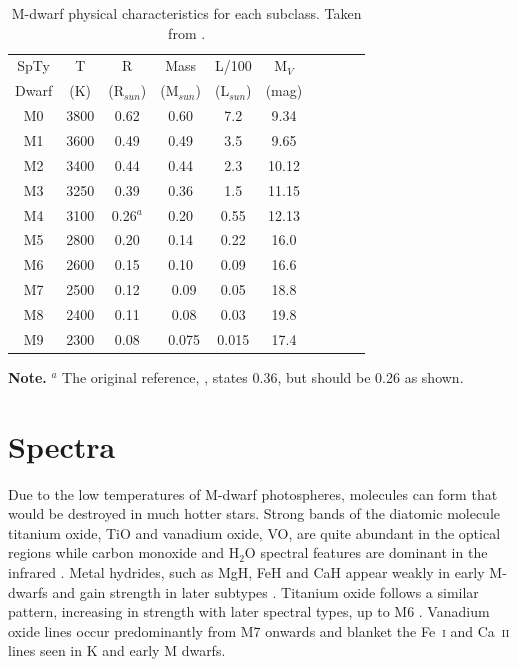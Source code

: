 \begin{table}[!h]
\centering
\begin{threeparttable}
\caption{M-dwarf physical characteristics for each subclass. Taken from \citet{2009Kaltenegger}.}
\begin{tabular}{| c | c | c | c | c | c | c | c | c | c |}
\hline
SpTy & T & R & Mass & L/100 & M$_{V}$ \\
Dwarf & (K) & (R$_{sun}$) & (M$_{sun}$) & (L$_{sun}$) & (mag) \\
\hline
M0 & 3800	& 0.62 & 0.60 & 7.2 & 9.34 \\
M1 & 3600	& 0.49 & 0.49 & 3.5 & 9.65 \\
M2 & 3400	& 0.44 & 0.44 & 2.3 & 10.12 \\	
M3 & 3250	& 0.39 & 0.36 & 1.5 & 11.15 \\
M4 & 3100 & 0.26$^a$ & 0.20 & 0.55 & 12.13 \\	
M5 & 2800	& 0.20 & 0.14 & 0.22 & 16.0 \\
M6 & 2600 & 0.15 & 0.10 & 0.09 & 16.6 \\
M7 & 2500	& 0.12 & ~0.09 & 0.05 & 18.8 \\	
M8 & 2400	& 0.11 & ~0.08 & 0.03	& 19.8 \\
M9 & 2300	& 0.08 & ~0.075	& 0.015 & 17.4 \\
\hline
\end{tabular}
\label{TabMsub}	
\begin{tablenotes}
\small
\item \textbf{Note.} $^a$ The original reference, \citet{2005Reid}, states 0.36, but should be 0.26 as shown.
\end{tablenotes}
\end{threeparttable}
\end{table}
\section{Spectra}
\label{secSpectra}
Due to the low temperatures of M-dwarf photospheres, molecules can form that would be destroyed in much hotter stars. Strong bands of the diatomic molecule titanium oxide, TiO and vanadium oxide, VO, are quite abundant in the optical regions while carbon monoxide and H$_{2}$O spectral features are dominant in the infrared \citep{2007Tarter,1943Morgan}. Metal hydrides, such as MgH, FeH and CaH appear weakly in early M-dwarfs and gain strength in later subtypes \citep{2005Reid}. Titanium oxide follows a similar pattern, increasing in strength with later spectral types, up to M6 \citep{2005Reid}. Vanadium oxide lines occur predominantly from M7 onwards and blanket the Fe \,\textsc{i} and Ca \,\textsc{ii} lines seen in K and early M dwarfs.\\

